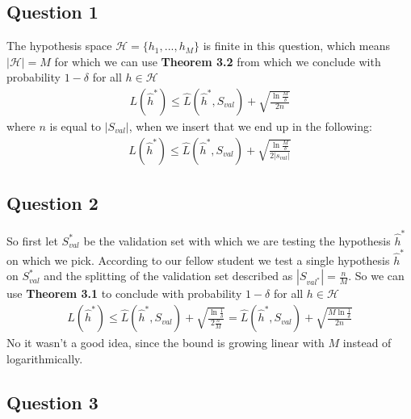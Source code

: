 \subsection{Question 1}
The hypothesis space $\mathcal{H} = \{h_1,...,h_M \}$ is finite in this question, which means $|\mathcal{H}| = M$ for which we can use \textbf{Theorem 3.2} from which we conclude with probability $1 - \delta$ for all $h \in \mathcal{H}$
\begin{align}
L(\hat{h}^*) \leq \hat{L}(\hat{h}^*, S_{val}) + \sqrt{\frac{\ln \frac{M}{\delta}}{2n}}
\end{align}
where $n$ is equal to $|S_{val}|$, when we insert that we end up in the following:
\begin{align}
L(\hat{h}^*) \leq \hat{L}(\hat{h}^*, S_{val}) + \sqrt{\frac{\ln \frac{M}{\delta}}{2|s_{val}|}}
\end{align}

\subsection{Question 2}
So first let $S_{val}^*$ be the validation set with which we are testing the hypothesis $\hat{h}^*$ on which we pick.
According to our fellow student we test a single hypothesis $\hat{h}^*$ on $S_{val}^*$ and the splitting of the validation set described as $|S_{val^*}|=\frac{n}{M}$.
So we can use \textbf{Theorem 3.1} to conclude with probability $1 - \delta$ for all $h \in \mathcal{H}$ 
\begin{align}
L(\hat{h}^*) \leq \hat{L}(\hat{h}^*, S_{val}) + \sqrt{\frac{\ln \frac{1}{\delta}}{2\frac{n}{M}}} = \hat{L}(\hat{h}^*, S_{val}) + \sqrt{\frac{ M \ln \frac{1}{\delta}}{2n}}
\end{align}
No it wasn't a good idea, since the bound is growing linear with $M$ instead of logarithmically.

\subsection{Question 3}


